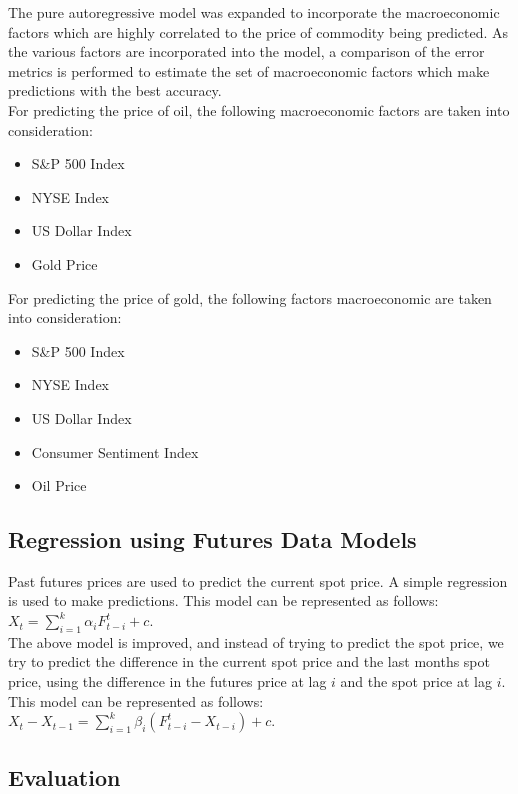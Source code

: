 \documentclass[runningheads]{llncs}
\begin{document}
\noindent The pure autoregressive model was expanded to incorporate the macroeconomic factors which are highly correlated to the price of commodity being predicted. As the various factors are incorporated into the model, a comparison of the error metrics is performed to estimate the set of macroeconomic factors which make predictions with the best accuracy. \\


\noindent For predicting the price of oil, the following macroeconomic factors are taken into consideration:
\begin {itemize}
\item S\&P 500 Index
\item NYSE Index
\item US Dollar Index
\item Gold Price
\end {itemize}

\noindent For predicting the price of gold, the following factors macroeconomic are taken into consideration:
\begin {itemize}
\item S\&P 500 Index
\item NYSE Index
\item US Dollar Index
\item Consumer Sentiment Index
\item Oil Price
\end {itemize}

\subsection{Regression using Futures Data Models}
Past futures prices are used to predict the current spot price. A simple regression is used to make predictions. This model can be represented as follows:\\
$X_t = \sum\limits_{i=1}^k \alpha_{i}F_{t-i}^t + c$.\\

\noindent The above model is improved, and instead of trying to predict the spot price, we try to predict the difference in the current spot price and the last months spot price, using the difference in the futures price at lag $i$ and the spot price at lag $i$. This model can be represented as follows:\\

$X_t - X_{t-1} = \sum\limits_{i=1}^k \beta_i(F_{t-i}^t - X_{t-i}) +c$.


\subsection{Evaluation}
\end{document}
